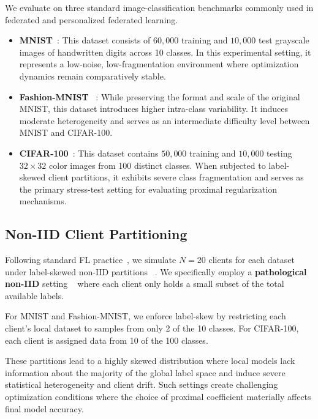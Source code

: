 \documentclass[letterpaper]{article} %
\begin{document}
We evaluate on three standard image-classification benchmarks commonly
used in federated and personalized federated learning.
\begin{itemize}
    \item \textbf{MNIST}~\cite{lecun2002gradient}: This dataset consists of $60,000$ training and $10,000$ test grayscale images of handwritten digits across 10 classes. In this experimental setting, it represents a low-noise, low-fragmentation environment where optimization dynamics remain comparatively stable.
    \item \textbf{Fashion-MNIST}~\cite{xiao2017fashion} : While preserving the format and scale of the original MNIST, this dataset introduces higher intra-class variability. It induces moderate heterogeneity and serves as an intermediate difficulty level between MNIST and CIFAR-100.
    \item \textbf{CIFAR-100}~\cite{krizhevsky2009learning}: This dataset contains $50,000$ training and $10,000$ testing $32 \times 32$ color images from 100 distinct classes. When subjected to label-skewed client partitions, it exhibits severe class fragmentation and serves as the primary stress-test setting for evaluating proximal regularization mechanisms.
\end{itemize}

\subsection{Non-IID Client Partitioning}
Following standard FL practice~\cite{mcmahan2017communication}, we simulate $N = 20$ clients for each
dataset under label-skewed non-IID partitions ~\cite{zhao2018federated,haller2023handling}. We specifically employ
a \textbf{pathological non-IID} setting ~\cite{mcmahan2017communication,zhang2025pfllib,zhang2022federated} where each client only holds a
small subset of the total available labels.

For MNIST and Fashion-MNIST, we enforce label-skew by restricting each
client's local dataset to samples from only 2 of the 10 classes. For
CIFAR-100, each client is assigned data from 10 of the 100 classes.

These partitions lead to a highly skewed distribution where local
models lack information about the majority of the global label space
and induce severe statistical heterogeneity and client drift. Such
settings create challenging optimization conditions where the choice
of proximal coefficient materially affects final model accuracy.
\end{document}
